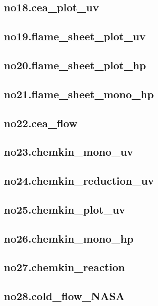 \documentclass{jsarticle}
\begin{document}
\subsection{no18.cea\_plot\_uv}
\subsection{no19.flame\_sheet\_plot\_uv}
\subsection{no20.flame\_sheet\_plot\_hp}
\subsection{no21.flame\_sheet\_mono\_hp}
\subsection{no22.cea\_flow}
\subsection{no23.chemkin\_mono\_uv}
\subsection{no24.chemkin\_reduction\_uv}
\subsection{no25.chemkin\_plot\_uv}
\subsection{no26.chemkin\_mono\_hp}
\subsection{no27.chemkin\_reaction}
\subsection{no28.cold\_flow\_NASA}
\end{document}
